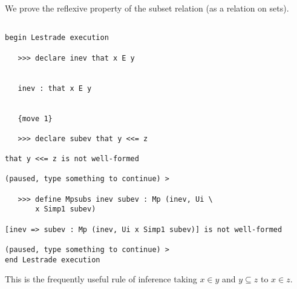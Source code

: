\documentclass[12pt]{article}
\begin{document}
We prove the reflexive property of the subset relation (as a relation on sets).

\begin{verbatim}

begin Lestrade execution

   >>> declare inev that x E y


   inev : that x E y


   {move 1}

   >>> declare subev that y <<= z

that y <<= z is not well-formed

(paused, type something to continue) >

   >>> define Mpsubs inev subev : Mp (inev, Ui \
       x Simp1 subev)

[inev => subev : Mp (inev, Ui x Simp1 subev)] is not well-formed

(paused, type something to continue) >
end Lestrade execution
\end{verbatim}

This is the frequently useful rule of inference taking $x \in y$ and $y \subseteq z$ to $x \in z$.
\end{document}
